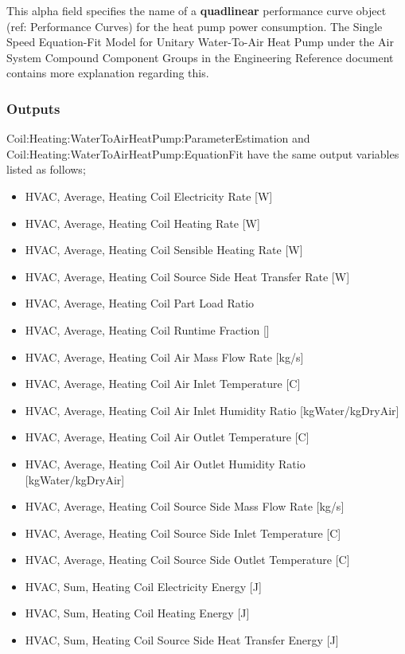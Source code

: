 This alpha field specifies the name of a \textbf{quadlinear} performance curve object (ref: Performance Curves) for the heat pump power consumption. The Single Speed Equation-Fit Model for Unitary Water-To-Air Heat Pump under the Air System Compound Component Groups in the Engineering Reference document contains more explanation regarding this.

\subsubsection{Outputs}\label{outputs-27}

Coil:Heating:WaterToAirHeatPump:ParameterEstimation and Coil:Heating:WaterToAirHeatPump:EquationFit have the same output variables listed as follows;

\begin{itemize}
\item
  HVAC, Average, Heating Coil Electricity Rate {[}W{]}
\item
  HVAC, Average, Heating Coil Heating Rate {[}W{]}
\item
  HVAC, Average, Heating Coil Sensible Heating Rate {[}W{]}
\item
  HVAC, Average, Heating Coil Source Side Heat Transfer Rate {[}W{]}
\item
  HVAC, Average, Heating Coil Part Load Ratio
\item
  HVAC, Average, Heating Coil Runtime Fraction {[]}
\item
  HVAC, Average, Heating Coil Air Mass Flow Rate {[}kg/s{]}
\item
  HVAC, Average, Heating Coil Air Inlet Temperature {[}C{]}
\item
  HVAC, Average, Heating Coil Air Inlet Humidity Ratio {[}kgWater/kgDryAir{]}
\item
  HVAC, Average, Heating Coil Air Outlet Temperature {[}C{]}
\item
  HVAC, Average, Heating Coil Air Outlet Humidity Ratio {[}kgWater/kgDryAir{]}
\item
  HVAC, Average, Heating Coil Source Side Mass Flow Rate {[}kg/s{]}
\item
  HVAC, Average, Heating Coil Source Side Inlet Temperature {[}C{]}
\item
  HVAC, Average, Heating Coil Source Side Outlet Temperature {[}C{]}
\item
  HVAC, Sum, Heating Coil Electricity Energy {[}J{]}
\item
  HVAC, Sum, Heating Coil Heating Energy {[}J{]}
\item
  HVAC, Sum, Heating Coil Source Side Heat Transfer Energy {[}J{]}
\end{itemize}

